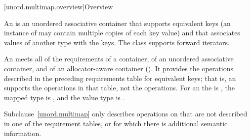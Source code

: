 [unord.multimap.overview]{Overview}

\pnum
{}%
%
An  is an unordered associative container
that supports equivalent keys (an instance of  may contain
multiple copies of each key value) and that associates values of
another type  with the keys.
The  class
supports forward iterators.

\pnum
An  meets all of the requirements of a container, of an
unordered associative container, and of an allocator-aware container
(). It provides the operations described in the
preceding requirements table for equivalent keys; that is, an 
supports the  operations in that table, not the  operations.
For an  the  is , the
mapped type is , and the value type is .

\pnum
Subclause~\ref{unord.multimap} only describes operations on 
that are not described in one of the requirement tables, or for which
there is additional semantic information.

